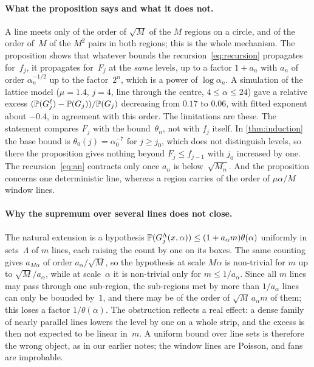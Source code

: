 \documentclass[11pt,letterpaper]{article}
\begin{document}
\paragraph{What the proposition says and what it does not.} A line meets only of the order of $\sqrt M$ of the $M$ regions on a circle, and of the order of~$M$ of the $M^2$ pairs in both regions; this is the whole mechanism. The proposition shows that whatever bounds the recursion~\eqref{eq:recursion} propagates for~$f_j$, it propagates for~$F_j$ at the \emph{same} levels, up to a factor $1+a_n$ with $a_n$ of order $\alpha_n^{-1/2}$ up to the factor~$2^n$, which is a power of $\log\alpha_n$. A simulation of the lattice model ($\mu=1.4$, $j=4$, line through the centre, $4\le\alpha\le24$) gave a relative excess $(\P(G^\ell_j)-\P(G_j))/\P(G_j)$ decreasing from $0.17$ to $0.06$, with fitted exponent about $-0.4$, in agreement with this order. The limitations are these. The statement compares $F_j$ with the bound~$\theta_n$, not with $f_j$ itself. In \cref{thm:induction} the base bound is $\theta_0(j)=\alpha_0^{-7}$ for $j\ge j_0$, which does not distinguish levels, so there the proposition gives nothing beyond $F_j\le f_{j-1}$ with $j_0$ increased by one. The recursion~\eqref{eq:an} contracts only once $a_n$ is below~$\sqrt{M_n}$. And the proposition concerns one deterministic line, whereas a region carries of the order of $\mu\alpha/M$ window lines.

\paragraph{Why the supremum over several lines does not close.} The natural extension is a hypothesis $\P(G^{\Lambda}_j(x,\alpha))\le(1+a_\alpha m)\theta(\alpha)$ uniformly in sets~$\Lambda$ of $m$ lines, each raising the count by one on its boxes. The same counting gives $a_{M\alpha}$ of order $a_\alpha/\sqrt M$, so the hypothesis at scale $M\alpha$ is non-trivial for $m$ up to $\sqrt M/a_\alpha$, while at scale~$\alpha$ it is non-trivial only for $m\le1/a_\alpha$. Since all $m$ lines may pass through one sub-region, the sub-regions met by more than $1/a_\alpha$ lines can only be bounded by~$1$, and there may be of the order of $\sqrt M\,a_\alpha m$ of them; this loses a factor $1/\theta(\alpha)$. The obstruction reflects a real effect: a dense family of nearly parallel lines lowers the level by one on a whole strip, and the excess is then not expected to be linear in~$m$. A uniform bound over line sets is therefore the wrong object, as in our earlier notes; the window lines are Poisson, and fans are improbable.
\end{document}
